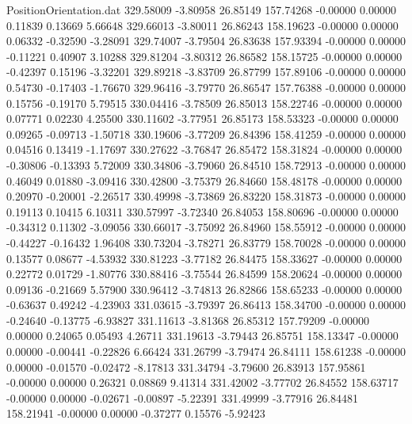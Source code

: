 \begin{filecontents}{PositionOrientation.dat}
 329.58009   -3.80958   26.85149   157.74268   -0.00000    0.00000    0.11839    0.13669    5.66648
 329.66013   -3.80011   26.86243   158.19623   -0.00000    0.00000    0.06332   -0.32590   -3.28091
 329.74007   -3.79504   26.83638   157.93394   -0.00000    0.00000   -0.11221    0.40907    3.10288
 329.81204   -3.80312   26.86582   158.15725   -0.00000    0.00000   -0.42397    0.15196   -3.32201
 329.89218   -3.83709   26.87799   157.89106   -0.00000    0.00000    0.54730   -0.17403   -1.76670
 329.96416   -3.79770   26.86547   157.76388   -0.00000    0.00000    0.15756   -0.19170    5.79515
 330.04416   -3.78509   26.85013   158.22746   -0.00000    0.00000    0.07771    0.02230    4.25500
 330.11602   -3.77951   26.85173   158.53323   -0.00000    0.00000    0.09265   -0.09713   -1.50718
 330.19606   -3.77209   26.84396   158.41259   -0.00000    0.00000    0.04516    0.13419   -1.17697
 330.27622   -3.76847   26.85472   158.31824   -0.00000    0.00000   -0.30806   -0.13393    5.72009
 330.34806   -3.79060   26.84510   158.72913   -0.00000    0.00000    0.46049    0.01880   -3.09416
 330.42800   -3.75379   26.84660   158.48178   -0.00000    0.00000    0.20970   -0.20001   -2.26517
 330.49998   -3.73869   26.83220   158.31873   -0.00000    0.00000    0.19113    0.10415    6.10311
 330.57997   -3.72340   26.84053   158.80696   -0.00000    0.00000   -0.34312    0.11302   -3.09056
 330.66017   -3.75092   26.84960   158.55912   -0.00000    0.00000   -0.44227   -0.16432    1.96408
 330.73204   -3.78271   26.83779   158.70028   -0.00000    0.00000    0.13577    0.08677   -4.53932
 330.81223   -3.77182   26.84475   158.33627   -0.00000    0.00000    0.22772    0.01729   -1.80776
 330.88416   -3.75544   26.84599   158.20624   -0.00000    0.00000    0.09136   -0.21669    5.57900
 330.96412   -3.74813   26.82866   158.65233   -0.00000    0.00000   -0.63637    0.49242   -4.23903
 331.03615   -3.79397   26.86413   158.34700   -0.00000    0.00000   -0.24640   -0.13775   -6.93827
 331.11613   -3.81368   26.85312   157.79209   -0.00000    0.00000    0.24065    0.05493    4.26711
 331.19613   -3.79443   26.85751   158.13347   -0.00000    0.00000   -0.00441   -0.22826    6.66424
 331.26799   -3.79474   26.84111   158.61238   -0.00000    0.00000   -0.01570   -0.02472   -8.17813
 331.34794   -3.79600   26.83913   157.95861   -0.00000    0.00000    0.26321    0.08869    9.41314
 331.42002   -3.77702   26.84552   158.63717   -0.00000    0.00000   -0.02671   -0.00897   -5.22391
 331.49999   -3.77916   26.84481   158.21941   -0.00000    0.00000   -0.37277    0.15576   -5.92423

\end{filecontents}

